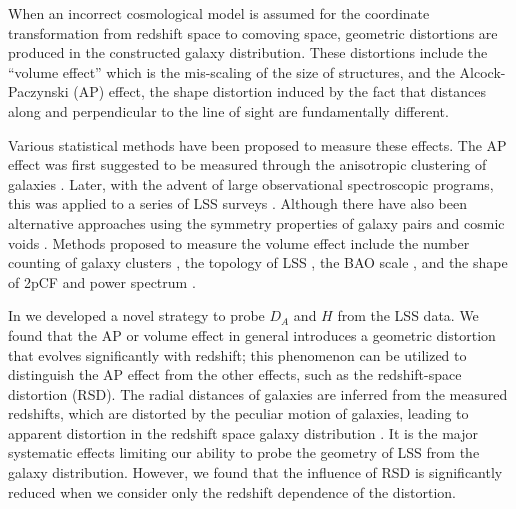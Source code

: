 \documentclass[iop]{emulateapj}
\begin{document}
When an incorrect cosmological model is assumed for the coordinate transformation from redshift space to comoving space,
geometric distortions are produced in the constructed galaxy distribution. 
These distortions include the ``volume effect'' which is the mis-scaling of the size of structures,
and the Alcock-Paczynski (AP) effect, the shape distortion induced by the fact that distances along and perpendicular to the line of sight are fundamentally different.

Various statistical methods have been proposed to measure these effects.
The AP effect was first suggested to be measured through the anisotropic clustering of galaxies \citep{Ballinger1996,Matsubara1996}. Later, with the advent of large observational spectroscopic programs, this was applied to a series of LSS surveys
\citep{Outram2004,Blake2011,ChuangWang2012,Reid2012,Beutler2013,Linder2013,2014arXiv1407.2257S, Jeong2014,Sutter2014,2014ApJ...781...96L,Alam2016, Beutler2016, Sanchez2016}.
Although there have also been alternative approaches using the symmetry properties of galaxy pairs \citep{Marinoni2010,Jennings2011,BB2012}
and cosmic voids \citep{Ryden1995,LavausWandelt1995,Sutter2014,Qingqing2016}.
Methods proposed to measure the volume effect include the number counting of 
galaxy clusters \citep{PS1974,VL1996}, the topology of LSS \citep{topology},
the BAO scale \citep{EHT1998,BG03,SE03},
and the shape of 2pCF and power spectrum \citep{Sanchez2006,Sanchez2009}.



In \cite{Li2014,Li2015,Li2016} we developed a novel strategy to probe $D_A$ and $H$ from the LSS data.
We found that the AP or volume effect in general introduces a geometric distortion that evolves significantly with redshift;
this phenomenon can be utilized to distinguish the AP effect from the other effects, such as the redshift-space distortion (RSD).
The radial distances of galaxies are inferred from the measured redshifts, which are distorted by the peculiar motion of galaxies, 
leading to apparent distortion in the redshift space galaxy distribution \citep{FOG,Kaiser1987,Ballinger1996}.
It is the major systematic effects limiting our ability to probe the geometry of LSS from the galaxy distribution.
However, we found that the influence of RSD is significantly reduced when we consider only the redshift dependence of the distortion.
\end{document}
